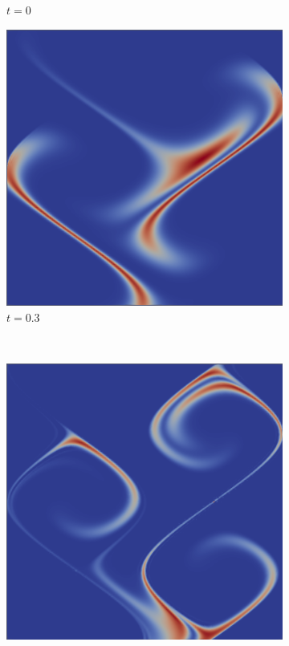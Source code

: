 \documentclass[a4paper,10pt]{article}
\begin{document}
\begin{figure}[!htb]
\begin{subfigure}[b]{0.3\textwidth}
    \caption{$t = 0$}
  \end{subfigure}
  \begin{subfigure}[b]{0.3\textwidth}
    \includegraphics[width=\textwidth]{./figures/solution.0003.png}
    \caption{$t = 0.3$}
  \end{subfigure}
  \\\vspace{2ex}
   \begin{subfigure}[b]{0.3\textwidth}
    \includegraphics[width=\textwidth]{./figures/solution.0008.png}

\end{subfigure}
\end{figure}
\end{document}
